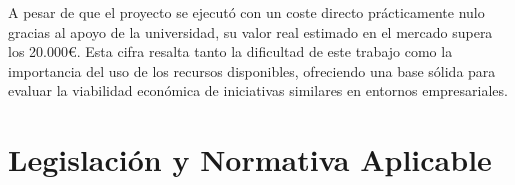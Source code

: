 A pesar de que el proyecto se ejecutó con un coste directo prácticamente nulo gracias al apoyo de la universidad, su valor real estimado en el mercado supera los 20.000€. Esta cifra resalta tanto la dificultad de este trabajo como la importancia del uso de los recursos disponibles, ofreciendo una base sólida para evaluar la viabilidad económica de iniciativas similares en entornos empresariales.



\newpage
\section{Legislación y Normativa Aplicable}

